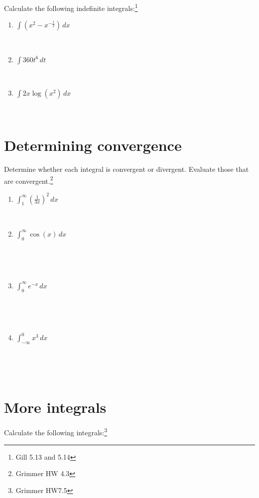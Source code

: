 \documentclass[
]{article}
\begin{document}
Calculate the following indefinite integrals:\footnote{Gill 5.13 and
  5.14}

\begin{enumerate}
\def\labelenumi{\alph{enumi}.}
\item
  \(\int (x^2-x^{-\frac{1}{2}}) \,dx\)

  ~\\
\item
  \(\int 360t^6 \,dt\)

  ~\\
\item
  \(\int 2x\log(x^2) \,dx\)

  ~\\
\end{enumerate}

\section{Determining convergence}\label{determining-convergence}

Determine whether each integral is convergent or divergent. Evaluate
those that are convergent.\footnote{Grimmer HW 4.3}

\begin{enumerate}
\def\labelenumi{\alph{enumi}.}
\item
  \(\int_1^{\infty} \left(\frac{1}{3x}\right)^2 \,dx\)

  ~\\
\item
  \(\int_0^{\infty} \cos (x) \, dx\)

  \strut \\
  \strut ~ ~ ~ ~
\item
  \(\int_0^{\infty} e^{-x} \,dx\)

  \strut \\
  \strut ~ ~ ~ ~
\item
  \(\int_{-\infty}^0 x^3 \,dx\)

  \strut \\
  \strut ~ ~ ~ ~
\end{enumerate}

\section{More integrals}\label{more-integrals}

Calculate the following integrals:\footnote{Grimmer HW7.5}
\end{document}
